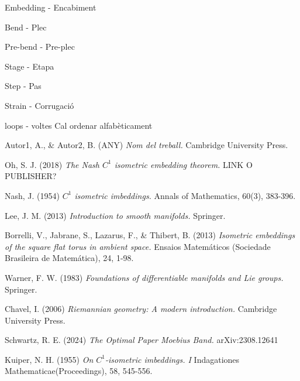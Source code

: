\documentclass[11pt,a4paper,openright,oneside]{book}
\numberwithin{equation}{section}
\theoremstyle{definition}
\begin{document}
Embedding - Encabiment

Bend - Plec

Pre-bend - Pre-plec

Stage - Etapa

Step - Pas

Strain - Corrugació

loops - voltes
\newpage
{\color{red} Cal ordenar alfabèticament}
\begin{thebibliography}{25}

{ \color{blue} 
Autor1, A., \& Autor2, B. (ANY)
\newblock \textit{Nom del treball.}
\newblock Cambridge University Press.
}

Oh, S. J. (2018)
\newblock \textit{The Nash $C^1$ isometric embedding theorem.}
\newblock LINK O PUBLISHER?

Nash, J. (1954)
\newblock \textit{$C^1$ isometric imbeddings.}
\newblock Annals of Mathematics, 60(3), 383-396.

Lee, J. M. (2013)
\newblock \textit{Introduction to smooth manifolds.}
\newblock Springer.

Borrelli, V., Jabrane, S., Lazarus, F., \& Thibert, B. (2013)
\newblock \textit{Isometric embeddings of the square flat torus in ambient space.}
\newblock Ensaios Matemáticos (Sociedade Brasileira de Matemática), 24, 1-98.

Warner, F. W. (1983)
\newblock \textit{Foundations of differentiable manifolds and Lie groups.}
\newblock Springer.

Chavel, I. (2006)
\newblock \textit{Riemannian geometry: A modern introduction.}
\newblock Cambridge University Press.

Schwartz, R. E. (2024)
\newblock \textit{The Optimal Paper Moebius Band.}
\newblock arXiv:2308.12641

Kuiper, N. H. (1955)
\newblock \textit{On $C^1$-isometric imbeddings. I}
\newblock Indagationes Mathematicae(Proceedings), 58, 545-556.



\end{thebibliography}
\end{document}
